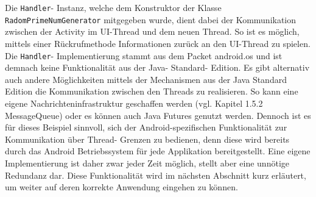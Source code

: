 \documentclass[12pt,oneside,a4paper,bibtotoc,liststotoc]{scrreprt}
\begin{document}
Die \texttt{Handler}- Instanz, welche dem Konstruktor der Klasse \texttt{RadomPrimeNumGenerator} mitgegeben wurde, dient dabei der Kommunikation zwischen der Activity im UI-Thread und dem neuen Thread. So ist es möglich, mittels einer Rückrufmethode Informationen zurück an den UI-Thread zu spielen. Die \texttt{Handler}- Implementierung stammt aus dem Packet android.os und ist demnach keine Funktionalität aus der Java- Standard- Edition. Es gibt alternativ auch andere Möglichkeiten mittels der Mechanismen aus der Java Standard Edition die Kommunikation zwischen den Threads zu realisieren. So kann eine eigene Nachrichteninfrastruktur geschaffen werden (vgl. Kapitel 1.5.2 MessageQueue) oder es können auch Java Futures genutzt werden. Dennoch ist es für dieses Beispiel sinnvoll, sich der Android-spezifischen Funktionalität zur Kommunikation über Thread- Grenzen zu bedienen, denn diese wird bereits durch das Android Betriebssystem für jede Applikation bereitgestellt. Eine eigene Implementierung ist daher zwar jeder Zeit möglich, stellt aber eine unnötige Redundanz dar. Diese Funktionalität wird im nächsten Abschnitt kurz erläutert, um weiter auf deren korrekte Anwendung eingehen zu können.
\end{document}
